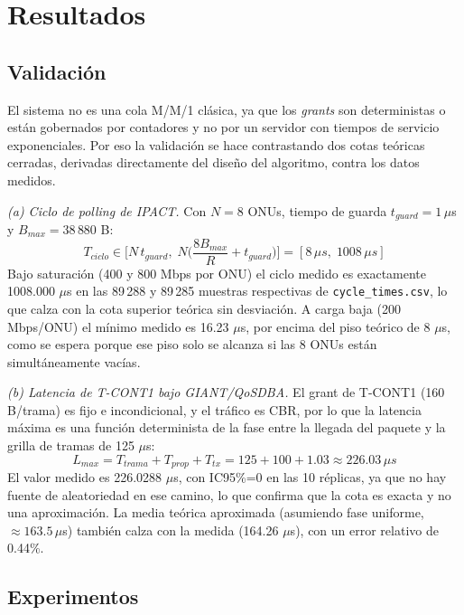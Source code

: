 \documentclass[conference]{IEEEtran}
\begin{document}
\section{Resultados}
\label{sec:resultados}

\subsection{Validación}

El sistema no es una cola M/M/1 clásica, ya que los \emph{grants} son
deterministas o están gobernados por contadores y no por un servidor con
tiempos de servicio exponenciales. Por eso la validación se hace
contrastando dos cotas teóricas cerradas, derivadas directamente del
diseño del algoritmo, contra los datos medidos.

\emph{(a) Ciclo de polling de IPACT.} Con $N=8$ ONUs, tiempo de guarda
$t_{guard}=1\,\mu$s y $B_{max}=38\,880$ B:
\begin{equation}
T_{ciclo} \in \Big[N\,t_{guard},\; N\Big(\frac{8B_{max}}{R}+t_{guard}\Big)\Big]
= [8\,\mu s,\; 1008\,\mu s]
\end{equation}
Bajo saturación (400 y 800 Mbps por ONU) el ciclo medido es exactamente
1008.000 $\mu$s en las 89\,288 y 89\,285 muestras respectivas de
\texttt{cycle\_times.csv}, lo que calza con la cota superior teórica sin
desviación. A carga baja (200 Mbps/ONU) el mínimo medido es 16.23
$\mu$s, por encima del piso teórico de 8 $\mu$s, como se espera porque
ese piso solo se alcanza si las 8 ONUs están simultáneamente vacías.

\emph{(b) Latencia de T-CONT1 bajo GIANT/QoSDBA.} El grant de T-CONT1
(160 B/trama) es fijo e incondicional, y el tráfico es CBR, por lo que la
latencia máxima es una función determinista de la fase entre la llegada
del paquete y la grilla de tramas de 125 $\mu$s:
\begin{equation}
L_{max} = T_{trama} + T_{prop} + T_{tx} = 125 + 100 + 1.03 \approx 226.03\,\mu s
\end{equation}
El valor medido es 226.0288 $\mu$s, con IC95\%=0 en las 10 réplicas, ya
que no hay fuente de aleatoriedad en ese camino, lo que confirma que la
cota es exacta y no una aproximación. La media teórica aproximada
(asumiendo fase uniforme, $\approx 163.5\,\mu$s) también calza con la
medida (164.26 $\mu$s), con un error relativo de 0.44\%.

\subsection{Experimentos}
\label{sec:experimentos}
\end{document}
